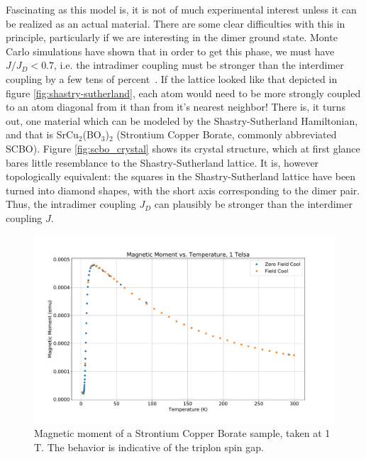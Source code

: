 \documentclass{thesis-umich}
\begin{document}
Fascinating as this model is, it is not of much experimental interest unless it can be realized as an actual material. There are some clear difficulties with this in principle, particularly if we are interesting in the dimer ground state. Monte Carlo simulations have shown that in order to get this phase, we must have $J/J_D < 0.7$, i.e. the intradimer coupling must be stronger than the interdimer coupling by a few tens of percent~\cite{Miyahara1999}. If the lattice looked like that depicted in figure \ref{fig:shastry-sutherland}, each atom would need to be more strongly coupled to an atom diagonal from it than from it's nearest neighbor! There is, it turns out, one material which can be modeled by the Shastry-Sutherland Hamiltonian, and that is SrCu$_2$(BO$_3$)$_2$ (Strontium Copper Borate, commonly abbreviated SCBO). Figure \ref{fig:scbo_crystal} shows its crystal structure, which at first glance bares little resemblance to the Shastry-Sutherland lattice. It is, however topologically equivalent: the squares in the Shastry-Sutherland lattice have been turned into diamond shapes, with the short axis corresponding to the dimer pair. Thus, the intradimer coupling $J_D$ can plausibly be stronger than the interdimer coupling $J$. 

\begin{figure}
	\caption[Magnetic Moment of an SCBO Sample]{Magnetic moment of a Strontium Copper Borate sample, taken at 1 T. The behavior is indicative of the triplon spin gap.}
	\label{fig:scbo_magmom}
	\includegraphics[width=\columnwidth]{figures/SCBO_m_vs_t.pdf}
\end{figure}
\end{document}
